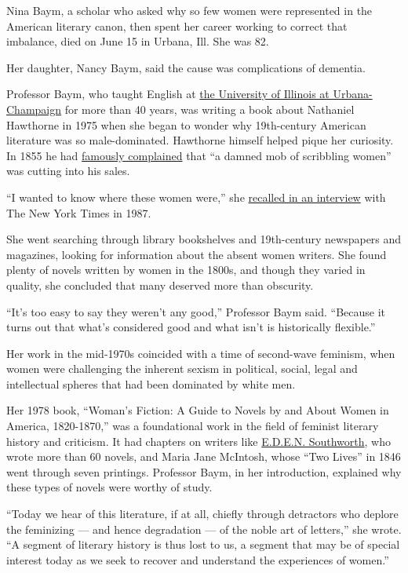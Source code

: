 Nina Baym, a scholar who asked why so few women were represented in the
American literary canon, then spent her career working to correct that
imbalance, died on June 15 in Urbana, Ill. She was 82.

Her daughter, Nancy Baym, said the cause was complications of dementia.

Professor Baym, who taught English at
\href{https://news.illinois.edu/view/6367/663930}{the University of
Illinois at Urbana-Champaign} for more than 40 years, was writing a book
about Nathaniel Hawthorne in 1975 when she began to wonder why
19th-century American literature was so male-dominated. Hawthorne
himself helped pique her curiosity. In 1855 he had
\href{http://debrabrenegan.blogspot.com/2011/07/damned-mob-of-scribbling-women.html}{famously
complained} that ``a damned mob of scribbling women'' was cutting into
his sales.

``I wanted to know where these women were,'' she
\href{https://www.nytimes3xbfgragh.onion/1987/12/06/magazine/literary-feminism-comes-of-age.html}{recalled
in an interview} with The New York Times in 1987.

She went searching through library bookshelves and 19th-century
newspapers and magazines, looking for information about the absent women
writers. She found plenty of novels written by women in the 1800s, and
though they varied in quality, she concluded that many deserved more
than obscurity.

``It's too easy to say they weren't any good,'' Professor Baym said.
``Because it turns out that what's considered good and what isn't is
historically flexible.''

Her work in the mid-1970s coincided with a time of second-wave feminism,
when women were challenging the inherent sexism in political, social,
legal and intellectual spheres that had been dominated by white men.

Her 1978 book, ``Woman's Fiction: A Guide to Novels by and About Women
in America, 1820-1870,'' was a foundational work in the field of
feminist literary history and criticism. It had chapters on writers like
\href{http://utc.iath.virginia.edu/sentimnt/southworthhp.html}{E.D.E.N.
Southworth}, who wrote more than 60 novels, and Maria Jane McIntosh,
whose ``Two Lives'' in 1846 went through seven printings. Professor
Baym, in her introduction, explained why these types of novels were
worthy of study.

``Today we hear of this literature, if at all, chiefly through
detractors who deplore the feminizing --- and hence degradation --- of
the noble art of letters,'' she wrote. ``A segment of literary history
is thus lost to us, a segment that may be of special interest today as
we seek to recover and understand the experiences of women.''

